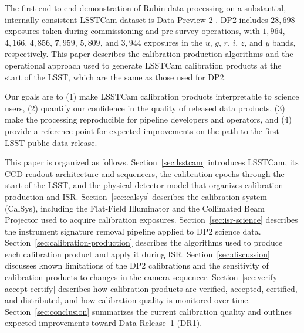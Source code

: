 The first end-to-end demonstration of Rubin data processing on a substantial, internally consistent LSSTCam dataset is Data Preview 2 \citep[DP2;][]{RTN-115}.
DP2 includes $28{,}698$ exposures taken during commissioning and pre-survey operations, with $1{,}964$, $4{,}166$, $4{,}856$, $7{,}959$, $5{,}809$, and $3{,}944$ exposures in the $u$, $g$, $r$, $i$, $z$, and $y$ bands, respectively.
This paper describes the calibration-production algorithms and the operational approach used to generate LSSTCam calibration products at the start of the LSST, which are the same as those used for DP2.

Our goals are to (1) make LSSTCam calibration products interpretable to science users, (2) quantify our confidence in the quality of released data products, (3) make the processing reproducible for pipeline developers and operators, and (4) provide a reference point for expected improvements on the path to the first LSST public data release.

This paper is organized as follows.
Section~\ref{sec:lsstcam} introduces LSSTCam, its CCD readout architecture and sequencers, the calibration epochs through the start of the LSST, and the physical detector model that organizes calibration production and ISR.
Section~\ref{sec:calsys} describes the calibration system (CalSys), including the Flat-Field Illuminator and the Collimated Beam Projector used to acquire calibration exposures.
Section~\ref{sec:isr-science} describes the instrument signature removal pipeline applied to DP2 science data.
Section~\ref{sec:calibration-production} describes the algorithms used to produce each calibration product and apply it during ISR.
Section~\ref{sec:discussion} discusses known limitations of the DP2 calibrations and the sensitivity of calibration products to changes in the camera sequencer.
Section~\ref{sec:verify-accept-certify} describes how calibration products are verified, accepted, certified, and distributed, and how calibration quality is monitored over time.
Section~\ref{sec:conclusion} summarizes the current calibration quality and outlines expected improvements toward Data Release~1 (DR1).
